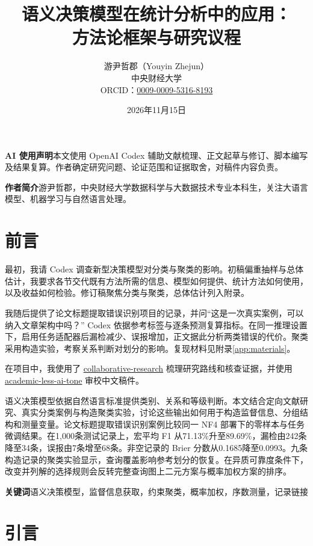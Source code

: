 \documentclass[UTF8,a4paper,zihao=-4,fontset=fandol]{ctexart}
\title{\bfseries 语义决策模型在统计分析中的应用：\\方法论框架与研究议程}
\author{游尹哲郡（Youyin Zhejun）\\[0.3em]
\small 中央财经大学\\
\small ORCID：\href{https://orcid.org/0009-0009-5316-8193}{0009-0009-5316-8193}}
\date{2026年11月15日}
\renewenvironment{abstract}
  {\par\medskip\normalsize{\centering\Large\bfseries\abstractname\par}\smallskip}
  {\par\medskip}
\begin{document}
\maketitle
\thispagestyle{plain}
\noindent\textbf{AI 使用声明}\quad 本文使用 OpenAI Codex 辅助文献梳理、正文起草与修订、脚本编写及结果复算。作者确定研究问题、论证范围和证据取舍，对稿件内容负责。\par\smallskip

\noindent\textbf{作者简介}\quad 游尹哲郡，中央财经大学数据科学与大数据技术专业本科生，关注大语言模型、机器学习与自然语言处理。

\section*{前言}

最初，我请 Codex 调查新型决策模型对分类与聚类的影响。初稿偏重抽样与总体估计，我要求各节交代既有方法所需的信息、模型如何提供、统计方法如何使用，以及收益如何检验。修订稿聚焦分类与聚类，总体估计列入附录。

我随后提供了论文标题提取错误识别项目的记录，并问“这是一次真实案例，可以纳入文章架构中吗？” Codex 依据参考标签与逐条预测复算指标。在同一推理设置下，启用任务适配器后漏检减少、误报增加，正文据此分析两类错误的代价。聚类采用构造实验，考察关系判断对划分的影响。复现材料见附录\ref{app:materials}。

在项目中，我使用了 \href{https://github.com/LeoAndJellyfish/collaborative-dev-research-skills}{collaborative-research} 梳理研究路线和核查证据，并使用 \href{https://github.com/LeoAndJellyfish/academic-less-ai-tone}{academic-less-ai-tone} 审校中文稿件。

\begin{abstract}
语义决策模型依据自然语言标准提供类别、关系和等级判断。本文结合定向文献研究、真实分类案例与构造聚类实验，讨论这些输出如何用于构造监督信息、分组结构和测量变量。论文标题提取错误识别案例比较同一 NF4 部署下的零样本与任务微调结果。在1,000条测试记录上，宏平均 F1 从71.13\%升至89.69\%，漏检由242条降至34条，误报由7条增至68条。非空记录的 Brier 分数从0.1685降至0.0993。九条构造记录的聚类实验显示，查询覆盖影响参考划分的恢复。在异质可靠度条件下，改变并列解的选择规则会反转完整查询图上二元方案与概率加权方案的排序。
\end{abstract}
\noindent\textbf{关键词}\quad 语义决策模型，监督信息获取，约束聚类，概率加权，序数测量，记录链接

\section{引言}\label{sec:intro}
\end{document}
